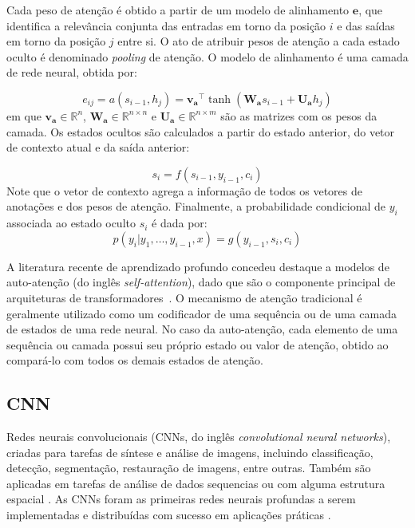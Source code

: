 Cada peso de atenção é obtido a partir de um modelo de alinhamento $\mathbf{e}$,
que identifica a relevância conjunta das entradas em torno da posição $i$ e das
saídas em torno da posição $j$ entre si. O ato de atribuir pesos de atenção a
cada estado oculto é denominado \textit{pooling} de atenção. O modelo de alinhamento é uma camada de
rede neural, obtida por:

\begin{equation}
    e_{ij} = a(s_{i-1}, h_j) = \mathbf{v_a}^\top \tanh(\mathbf{W_a}s_{i-1} + \mathbf{U_a}h_j)
\end{equation}
em que $\mathbf{v_a} \in \mathbb{R}^n$, $\mathbf{W_a} \in \mathbb{R}^{n \times
n}$ e $\mathbf{U_a} \in \mathbb{R}^{n \times m}$ são as matrizes com os pesos da
camada. Os estados ocultos são calculados a partir do estado anterior, do vetor de contexto atual e da saída anterior:

\begin{equation}
    s_i = f(s_{i-1}, y_{i-1}, c_i)
\end{equation}
Note que o vetor de contexto agrega a informação de todos os vetores de anotações e dos pesos de atenção. Finalmente, a probabilidade condicional de $y_i$ associada ao estado oculto $s_i$ é dada por:
\begin{equation}
  p(y_i | y_1, \ldots, y_{i-1}, x) = g(y_{i-1}, s_i, c_i)
\end{equation}

A literatura recente de aprendizado profundo concedeu destaque a modelos de
auto-atenção (do inglês \textit{self-attention}), dado que são o componente
principal de arquiteturas de transformadores~\cite{kim2017structured}. O
mecanismo de atenção tradicional é geralmente utilizado como um codificador de
uma sequência ou de uma camada de estados de uma rede neural. No caso da
auto-atenção, cada elemento de uma sequência ou camada possui seu próprio
estado ou valor de atenção, obtido ao compará-lo com todos os demais estados
de atenção.

\subsection{CNN}
Redes neurais convolucionais (CNNs, do inglês \textit{convolutional neural
networks}), criadas para tarefas de síntese e análise de imagens, incluindo
classificação, detecção, segmentação, restauração de imagens, entre outras.
Também são aplicadas em tarefas de análise de dados sequencias ou com alguma
estrutura espacial \cite{Bishop:DeepLearning24}. As CNNs foram as primeiras
redes neurais profundas a serem implementadas e distribuídas com sucesso em
aplicações práticas \cite{lecun1989}.

